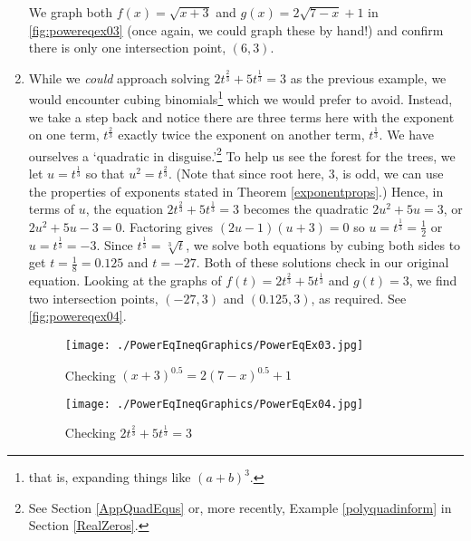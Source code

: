 \begin{ex}
\begin{enumerate}
We graph both $f(x) = \sqrt{x+3}$ and $g(x) = 2\sqrt{7-x} + 1$ in \autoref{fig:powereqex03} (once again, we could graph these by hand!) and confirm there is only one intersection point, $(6,3)$.

\item  While we \textit{could} approach solving  $2t^{\frac{2}{3}} + 5t^{\frac{1}{3}} = 3$ as the previous example, we would encounter cubing binomials\footnote{that is, expanding things like $(a+b)^3$.} which we would prefer to avoid.  Instead, we take a step back and notice there are three terms here with the exponent on one term, $t^{\frac{2}{3}}$ exactly twice the exponent on another term, $t^{\frac{1}{3}}$.  We have ourselves a `quadratic in disguise.'\footnote{See Section \ref{AppQuadEqus} or, more recently, Example \ref{polyquadinform} in Section \ref{RealZeros}.} To help us see the forest for the trees, we let $u = t^{\frac{1}{3}}$ so that $u^2 = t^{\frac{2}{3}}$. (Note that since root here, $3$, is odd, we can use the properties of exponents stated in Theorem \ref{exponentprops}.)  Hence, in terms of $u$, the equation   $2t^{\frac{2}{3}} + 5t^{\frac{1}{3}} = 3$ becomes the quadratic $2u^2 + 5u = 3$, or $2u^2 + 5u - 3 = 0$.  Factoring gives $(2u-1)(u+3) = 0$ so $u = t^{\frac{1}{3}} = \frac{1}{2}$ or $u = t^{\frac{1}{3}} = -3$.  Since $t^{\frac{1}{3}} = \sqrt[3]{t}$, we solve both equations by cubing both sides to get $t = \frac{1}{8} = 0.125$ and $t = -27$.  Both of these solutions check in our original equation.  Looking at the graphs of $f(t) = 2t^{\frac{2}{3}} + 5t^{\frac{1}{3}}$ and $g(t) = 3$, we find two intersection points, $(-27,3)$ and $(0.125,3)$, as required. See \autoref{fig:powereqex04}.

\begin{figure}
\begin{center}

\texttt{[image: ./PowerEqIneqGraphics/PowerEqEx03.jpg]}

\caption{Checking $(x+3)^{0.5} = 2(7-x)^{0.5}+1$}
\label{fig:powereqex03}
\end{center}
\end{figure}

\begin{figure}
\begin{center}
      
\texttt{[image: ./PowerEqIneqGraphics/PowerEqEx04.jpg]}

\caption{Checking  $2t^{\frac{2}{3}} + 5t^{\frac{1}{3}} = 3$}
\label{fig:powereqex04}
\end{center} 
\end{figure}


\end{enumerate}
\end{ex}
